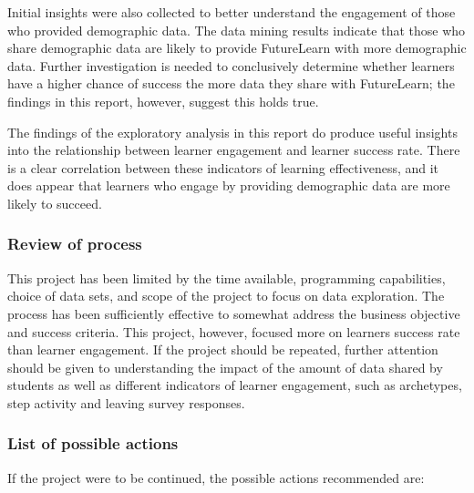 \documentclass[
]{article}
\begin{document}
Initial insights were also collected to better understand the engagement
of those who provided demographic data. The data mining results indicate
that those who share demographic data are likely to provide FutureLearn
with more demographic data. Further investigation is needed to
conclusively determine whether learners have a higher chance of success
the more data they share with FutureLearn; the findings in this report,
however, suggest this holds true.

The findings of the exploratory analysis in this report do produce
useful insights into the relationship between learner engagement and
learner success rate. There is a clear correlation between these
indicators of learning effectiveness, and it does appear that learners
who engage by providing demographic data are more likely to succeed.

\hypertarget{review-of-process}{%
\subsubsection{Review of process}\label{review-of-process}}

This project has been limited by the time available, programming
capabilities, choice of data sets, and scope of the project to focus on
data exploration. The process has been sufficiently effective to
somewhat address the business objective and success criteria. This
project, however, focused more on learners success rate than learner
engagement. If the project should be repeated, further attention should
be given to understanding the impact of the amount of data shared by
students as well as different indicators of learner engagement, such as
archetypes, step activity and leaving survey responses.

\hypertarget{list-of-possible-actions}{%
\subsubsection{List of possible
actions}\label{list-of-possible-actions}}

If the project were to be continued, the possible actions recommended
are:
\end{document}
